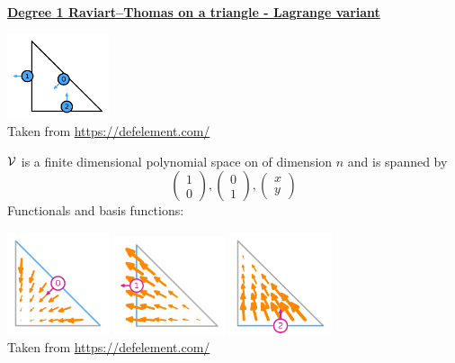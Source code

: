 \noindent
\underline{\bf Degree 1 Raviart–Thomas on a triangle - Lagrange variant}

\begin{center}
\includegraphics[width=3cm]{images/pair_raviart-thomas/element-Raviart-Thomas-variant-equispaced-triangle-1-dofs-large}\\
{\captionfont Taken from \url{https://defelement.com/}}
\end{center}

${\cal V}$ is a finite dimensional polynomial space on of dimension $n$ and is spanned by 
\[
\left( \begin{array}{c}1 \\ 0  \end{array} \right),
\left( \begin{array}{c}0 \\ 1  \end{array} \right),
\left( \begin{array}{c}x \\ y  \end{array} \right)
\]
Functionals and basis functions:

\begin{center}
\includegraphics[width=3cm]{images/pair_raviart-thomas/element-Raviart-Thomas-variant-equispaced-triangle-1-0-large}
\includegraphics[width=3.3cm]{images/pair_raviart-thomas/element-Raviart-Thomas-variant-equispaced-triangle-1-1-large}
\includegraphics[width=3cm]{images/pair_raviart-thomas/element-Raviart-Thomas-variant-equispaced-triangle-1-2-large}\\
{\captionfont Taken from \url{https://defelement.com/}}
\end{center}

